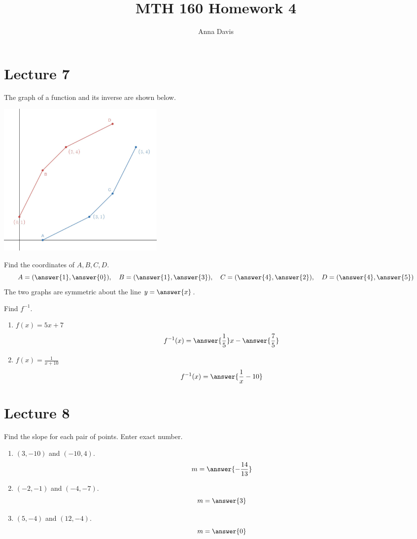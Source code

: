 \documentclass{ximera}
\author{Anna Davis} \title{MTH 160 Homework 4}
\begin{document}
\begin{abstract}

\end{abstract}
\maketitle

\section{Lecture 7}
\begin{problem}\label{prob:160hom3prob3}
The graph of a function and its inverse are shown below.  
\begin{image}
   \includegraphics[height=3in]{160H3pic1.jpg}
 \end{image}
Find the coordinates of $A, B, C, D$.
$$A=(\answer{1},\answer{0}),\quad B=(\answer{1},\answer{3}),\quad C=(\answer{4},\answer{2}),\quad D=(\answer{4},\answer{5})$$
The two graphs are symmetric about the line
$y=\answer{x}$.
\end{problem}
\begin{problem}\label{prob:160hom3prob4}
Find $f^{-1}$.
\begin{enumerate}
    \item $f(x)=5x+7$
    $$f^{-1}(x)=\answer{\frac{1}{5}}x-\answer{\frac{7}{5}}$$
    \item $f(x)=\frac{1}{x+10}$
    $$f^{-1}(x)=\answer{\frac{1}{x}-10}$$
\end{enumerate}

\end{problem}



 \section{Lecture 8}
\begin{problem}\label{prob:160hom4prob1} 
 Find the slope for each pair of points.  Enter exact number.
 \begin{enumerate}
     \item $(3, -10)$ and $(-10,4)$.
     $$m=\answer{-\frac{14}{13}}$$
     \item $(-2, -1)$ and $(-4,-7)$.
     $$m=\answer{3}$$
     \item $(5, -4)$ and $(12,-4)$.
     $$m=\answer{0}$$
 \end{enumerate}
 \end{problem}
 
\end{document}
